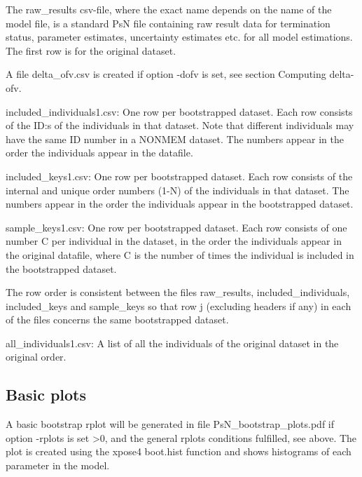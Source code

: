 The raw\_results csv-file, where the exact name depends on the name of the model file, 
is a standard PsN file containing raw result data for termination status, parameter estimates, uncertainty estimates etc. for all model estimations. 
The first row is for the original dataset.

A file delta\_ofv.csv is created if option -dofv is set, see section Computing delta-ofv.

included\_individuals1.csv: One row per bootstrapped dataset. Each row consists of the ID:s of the individuals in that dataset. Note that different individuals may have the same ID number in a NONMEM dataset. The numbers appear in the order the individuals appear in the datafile.

included\_keys1.csv: One row per bootstrapped dataset. Each row consists of the internal and unique order numbers (1-N) of the individuals in that dataset. The numbers appear in the order the individuals appear in the bootstrapped dataset. 

sample\_keys1.csv:  One row per bootstrapped dataset. Each row consists of one number C per individual in the dataset, in the order the individuals appear in the original datafile, where C is the number of times the individual is included in the bootstrapped dataset. 

The row order is consistent between the files raw\_results, included\_individuals, included\_keys and sample\_keys so that row j (excluding headers if any) in each of the files concerns the same bootstrapped dataset.

all\_individuals1.csv: A list of all the individuals of the original dataset in the original order.

\subsection{Basic plots}
A basic bootstrap rplot will be generated in file PsN\_bootstrap\_plots.pdf
if option -rplots is set >0,
and the general rplots conditions fulfilled, see above.
The plot is created using the xpose4 boot.hist function
and shows histograms of each parameter in the model.

